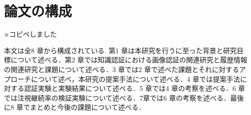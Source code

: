 \section{論文の構成}
※コピペしました

本文は全8 章から構成されている. 第1 章は本研究を行うに至った背景と研究目標について述べる．第2 章では知識認証における画像認証の関連研究と履歴情報の関連研究と課題について述べる．3 章では2 章で述べた課題とそれに対するアプローチについて述べ，本研究の提案手法について述べる．4 章では提案手法に対する認証実験と実験結果について述べる．5 章では4 章の考察を述べる．6 章では注視継続率の検証実験について述べる．7章では6 章の考察を述べる．最後に8 章でまとめと今後の課題について述べる．